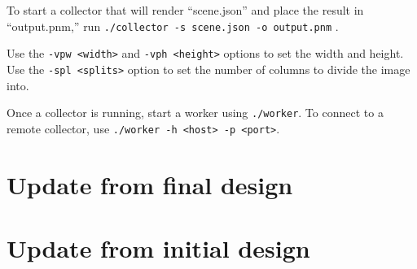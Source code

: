 \documentclass[letterpaper,twocolumn,10pt]{article}
\begin{document}
To start a collector that will render ``scene.json'' 
and place the result in ``output.pnm,'' run
\verb|./collector -s scene.json -o output.pnm|
.

Use the \verb|-vpw <width>| and \verb|-vph <height>| options to set the 
width and height. Use the \verb|-spl <splits>| option to set the number
of columns to divide the image into.

Once a collector is running, start a worker using \verb|./worker|. 
To connect to a remote collector, use \verb|./worker -h <host> -p <port>|.

\section{Update from final design}



\section{Update from initial design}


\end{document}
